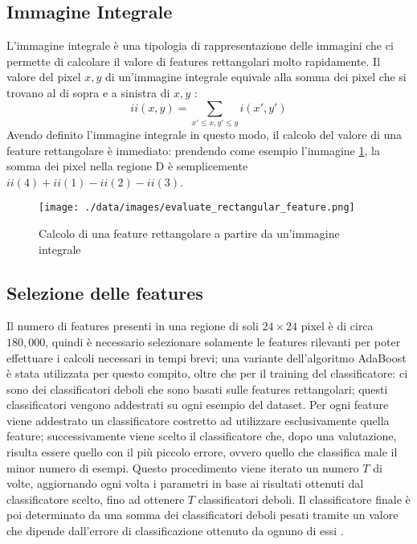 \subsection{Immagine Integrale}
L'immagine integrale è una tipologia di rappresentazione delle immagini che ci permette di calcolare il valore di features rettangolari molto rapidamente. Il valore del pixel $x,y$ di un'immagine integrale equivale alla somma dei pixel che si trovano al di sopra e a sinistra di $x,y$ \cite{viola2001rapid}:
\begin{equation}
	ii(x,y)=\sum_{x'\le{x},y'\le{y}}i(x',y') 
\end{equation}
Avendo definito l'immagine integrale in questo modo, il calcolo del valore di una feature rettangolare è immediato: prendendo come esempio l'immagine \ref{integral}, la somma dei pixel nella regione D è semplicemente $ii(4)+ii(1)-ii(2)-ii(3)$.
\begin{figure}
	\centering
	\texttt{[image: ./data/images/evaluate\_rectangular\_feature.png]}
	\caption{Calcolo di una feature rettangolare a partire da un'immagine integrale \cite{viola2001rapid}}
	\label{integral}
\end{figure}

\subsection{Selezione delle features}
Il numero di features presenti in una regione di soli $24\times24$ pixel è di circa $180,000$, quindi è necessario selezionare solamente le features rilevanti per poter effettuare i calcoli necessari in tempi brevi; una variante dell'algoritmo AdaBoost è stata utilizzata per questo compito, oltre che per il training del classificatore: ci sono dei classificatori deboli che sono basati sulle features rettangolari; questi classificatori vengono addestrati su ogni esempio del dataset. Per ogni feature viene addestrato un classificatore costretto ad utilizzare esclusivamente quella feature; successivamente viene scelto il classificatore che, dopo una valutazione, risulta essere quello con il più piccolo errore, ovvero quello che classifica male il minor numero di esempi. Questo procedimento viene iterato un numero $T$ di volte, aggiornando ogni volta i parametri in base ai risultati ottenuti dal classificatore scelto, fino ad ottenere $T$ classificatori deboli. Il classificatore finale è poi determinato da una somma dei classificatori deboli pesati tramite un valore che dipende dall'errore di classificazione ottenuto da ognuno di essi \cite{viola2001rapid}.

